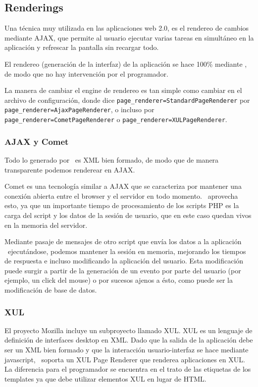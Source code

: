 \subsection{Renderings}
\label{sub-render}

Una técnica muy utilizada en las aplicaciones web 2.0, es el rendereo de cambios mediante AJAX, que permite al usuario ejecutar varias tareas en simultáneo en la aplicación y refrescar la pantalla sin recargar todo.

El rendereo (generación de la interfaz) de la aplicación se hace 100\% mediante \PWB, de modo que no hay intervención por el programador.

La manera de cambiar el engine de rendereo es tan simple como cambiar en el archivo de configuración, donde dice \verb"page_renderer=StandardPageRenderer" por \verb"page_renderer=AjaxPageRenderer", o incluso por \verb"page_renderer=CometPageRenderer" o \verb"page_renderer=XULPageRenderer".

\subsubsection{AJAX y Comet}

Todo lo generado por \PWB \ es XML bien formado, de modo que de manera transparente podemos renderear en AJAX.

Comet es una tecnología similar a AJAX que se caracteriza por mantener una conexión abierta entre el browser y el servidor en todo momento. \PWB \ aprovecha esto, ya que un importante tiempo de procesamiento de los scripts PHP es la carga del script y los datos de la sesión de usuario, que en este caso quedan vivos en la memoria del servidor.

Mediante pasaje de mensajes de otro script que envía los datos a la aplicación \PWB \ ejecutándose, podemos mantener la sesión en memoria, mejorando los tiempos de respuesta e incluso modificando la aplicación del usuario. Esta modificación puede surgir a partir de la generación de un evento por parte del usuario (por ejemplo, un click del mouse) o por sucesos ajenos a ésto, como puede ser la modificación de base de datos.

\subsubsection{XUL}

El proyecto Mozilla incluye un subproyecto llamado XUL\cite{XUL}. XUL es un lenguaje de definición de interfaces desktop en XML. Dado que la salida de la aplicación debe ser un XML bien formado y que la interacción usuario-interfaz se hace mediante javascript, \PWB \ soporta un XUL Page Renderer que renderea aplicaciones en XUL. La diferencia para el programador se encuentra en el trato de las etiquetas de los templates ya que debe utilizar elementos XUL en lugar de HTML.

